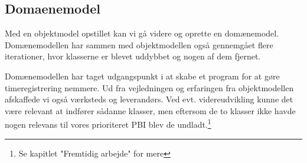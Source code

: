 \subsection{Domaenemodel}

Med en objektmodel opstillet kan vi gå videre og oprette en domænemodel. Domænemodellen har sammen med objektmodellen også gennemgået flere iterationer, hvor klasserne er blevet uddybbet og nogen af dem fjernet. 

Domænemodellen har taget udgangspunkt i at skabe et program for at gøre timeregistrering nemmere. Ud fra vejledningen og erfaringen fra objektmodellen afskaffede vi også værksteds og leverandørs. Ved evt. videreudvikling kunne det være relevant at indfører sådanne klasser, men eftersom de to klasser ikke havde nogen relevans til vores prioriteret PBI blev de undladt.\footnote{Se kapitlet "Fremtidig arbejde" for mere}